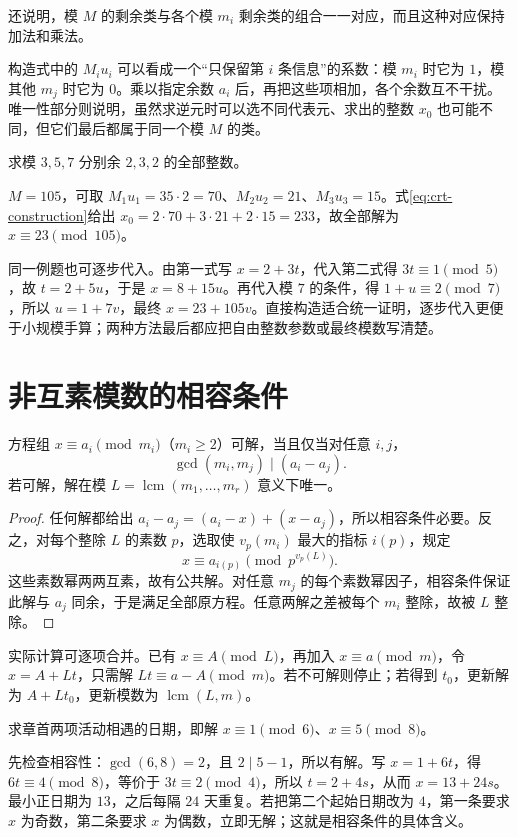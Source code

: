 \documentclass[UTF8,12pt,a4paper,fontset=fandol]{ctexbook}
\begin{document}
还说明，模 $M$ 的剩余类与各个模 $m_i$ 剩余类的组合一一对应，而且这种对应保持加法和乘法。

构造式中的 $M_iu_i$ 可以看成一个“只保留第 $i$ 条信息”的系数：模 $m_i$ 时它为 $1$，模其他 $m_j$ 时它为 $0$。乘以指定余数 $a_i$ 后，再把这些项相加，各个余数互不干扰。唯一性部分则说明，虽然求逆元时可以选不同代表元、求出的整数 $x_0$ 也可能不同，但它们最后都属于同一个模 $M$ 的类。

\begin{example}
求模 $3,5,7$ 分别余 $2,3,2$ 的全部整数。
\end{example}
\begin{solve}
$M=105$，可取 $M_1u_1=35\cdot2=70$、$M_2u_2=21$、$M_3u_3=15$。式\eqref{eq:crt-construction}给出 $x_0=2\cdot70+3\cdot21+2\cdot15=233$，故全部解为 $x\equiv23\pmod{105}$。
\end{solve}

同一例题也可逐步代入。由第一式写 $x=2+3t$，代入第二式得 $3t\equiv1\pmod5$，故 $t=2+5u$，于是 $x=8+15u$。再代入模 $7$ 的条件，得 $1+u\equiv2\pmod7$，所以 $u=1+7v$，最终 $x=23+105v$。直接构造适合统一证明，逐步代入更便于小规模手算；两种方法最后都应把自由整数参数或最终模数写清楚。

\section{非互素模数的相容条件}

\begin{theorem}
\label{thm:general-crt}
方程组 $x\equiv a_i\pmod{m_i}$（$m_i\ge2$）可解，当且仅当对任意 $i,j$，
\[
 \gcd(m_i,m_j)\mid(a_i-a_j).
\]
若可解，解在模 $L=\operatorname{lcm}(m_1,\ldots,m_r)$ 意义下唯一。
\end{theorem}
\begin{proof}
任何解都给出 $a_i-a_j=(a_i-x)+(x-a_j)$，所以相容条件必要。反之，对每个整除 $L$ 的素数 $p$，选取使 $v_p(m_i)$ 最大的指标 $i(p)$，规定
\[
 x\equiv a_{i(p)}\pmod{p^{v_p(L)}}.
\]
这些素数幂两两互素，故有公共解。对任意 $m_j$ 的每个素数幂因子，相容条件保证此解与 $a_j$ 同余，于是满足全部原方程。任意两解之差被每个 $m_i$ 整除，故被 $L$ 整除。
\end{proof}

实际计算可逐项合并。已有 $x\equiv A\pmod L$，再加入 $x\equiv a\pmod m$，令 $x=A+Lt$，只需解 $Lt\equiv a-A\pmod m$。若不可解则停止；若得到 $t_0$，更新解为 $A+Lt_0$，更新模数为 $\operatorname{lcm}(L,m)$。

\begin{example}[有公共因子的两条周期约束]
求章首两项活动相遇的日期，即解 $x\equiv1\pmod6$、$x\equiv5\pmod8$。
\end{example}
\begin{solve}
先检查相容性：$\gcd(6,8)=2$，且 $2\mid5-1$，所以有解。写 $x=1+6t$，得 $6t\equiv4\pmod8$，等价于 $3t\equiv2\pmod4$，所以 $t=2+4s$，从而 $x=13+24s$。最小正日期为 $13$，之后每隔 $24$ 天重复。若把第二个起始日期改为 $4$，第一条要求 $x$ 为奇数，第二条要求 $x$ 为偶数，立即无解；这就是相容条件的具体含义。
\end{solve}
\end{document}

